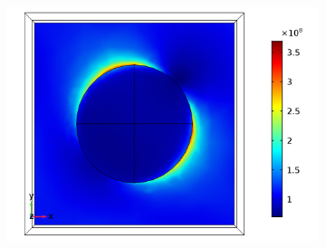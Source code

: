 \begin{figure}[htb!]
\begin{subfigure}{0.32\textwidth}
        \centering
        \includegraphics[width=\linewidth]{figures/ch4/S5A/FieldDistribution/phi0-90/Sample5A_TE_Slice@z=0_wl=350_phi=45.png}
   \end{subfigure}


\end{figure}
